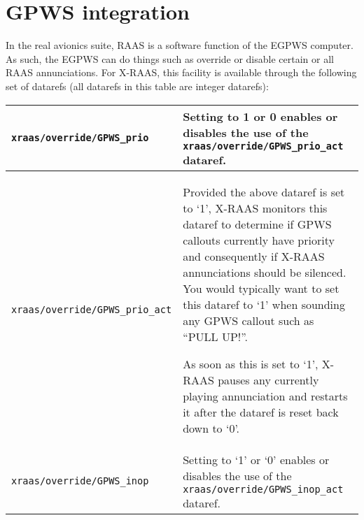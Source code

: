 \documentclass[a4paper,12pt]{article}
\newcommand{\dataref}[1]{\texttt{#1}}
\begin{document}
\section{GPWS integration}

In the real avionics suite, RAAS is a software function of the EGPWS
computer. As such, the EGPWS can do things such as override or disable
certain or all RAAS annunciations. For X-RAAS, this facility is available
through the following set of datarefs (all datarefs in this table are
integer datarefs):

{\small
\begin{center}




\tablelasttail{\hline}

\begin{supertabular}{|p{0.42\textwidth}|p{0.51\textwidth}|}

\dataref{xraas/override/GPWS\_prio} &
Setting to 1 or 0 enables or disables the use of the
\dataref{xraas/override/GPWS\_prio\_act} dataref. \\

\hline

\dataref{xraas/override/GPWS\_prio\_act} &
Provided the above dataref is set to `1', X-RAAS monitors this dataref to
determine if GPWS callouts currently have priority and consequently if
X-RAAS annunciations should be silenced. You would typically want to set
this dataref to `1' when sounding any GPWS callout such as ``PULL UP!''.\par
As soon as this is set to `1', X-RAAS pauses any currently playing
annunciation and restarts it after the dataref is reset back down to `0'. \\

\hline

\dataref{xraas/override/GPWS\_inop} &
Setting to `1' or `0' enables or disables the use of the
\dataref{xraas/override/GPWS\_inop\_act} dataref. \\


\end{supertabular}
\end{center}}
\end{document}
